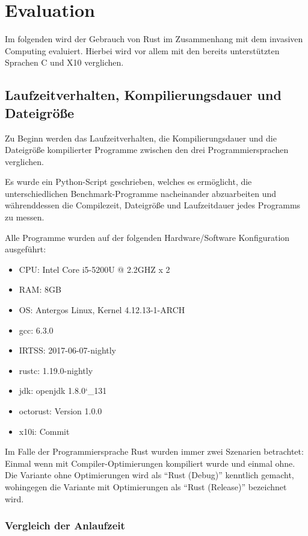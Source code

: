 \chapter{Evaluation}\label{sec:eval}


Im folgenden wird der Gebrauch von Rust im Zusammenhang mit dem invasiven Computing evaluiert. Hierbei
wird vor allem mit den bereits unterstützten Sprachen C und X10 verglichen.

\section{Laufzeitverhalten, Kompilierungsdauer und Dateigröße}

Zu Beginn werden das Laufzeitverhalten, die Kompilierungsdauer und die Dateigröße kompilierter Programme zwischen
den drei Programmiersprachen verglichen.

Es wurde ein Python-Script geschrieben, welches es ermöglicht, die unterschiedlichen Benchmark-Programme nacheinander
abzuarbeiten und währenddessen die Compilezeit, Dateigröße und Laufzeitdauer jedes Programms zu messen.

Alle Programme wurden auf der folgenden Hardware/Software Konfiguration ausgeführt:

\begin{itemize}
	\item{CPU: Intel Core i5-5200U @ 2.2GHZ x 2}
	\item{RAM: 8GB}
	\item{OS: Antergos Linux, Kernel 4.12.13-1-ARCH}
	\item{gcc: 6.3.0}
	\item{IRTSS: 2017-06-07-nightly}
	\item{rustc: 1.19.0-nightly}
	\item{jdk: openjdk 1.8.0\char`_131}
	\item{octorust: Version 1.0.0}
	\item{x10i: Commit}
\end{itemize}

Im Falle der Programmiersprache Rust wurden immer zwei Szenarien betrachtet: Einmal wenn mit Compiler-Optimierungen
kompiliert wurde und einmal ohne. Die Variante ohne Optimierungen wird als ``Rust (Debug)'' kenntlich gemacht,
wohingegen die Variante mit Optimierungen als ``Rust (Release)'' bezeichnet wird.

\subsection{Vergleich der Anlaufzeit}


